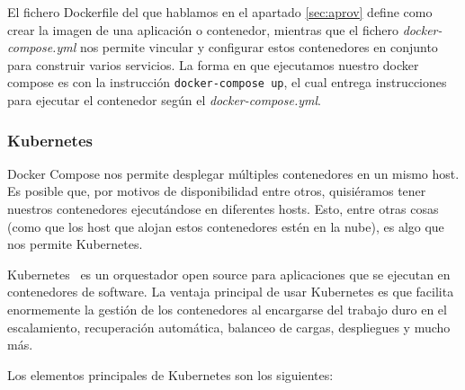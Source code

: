 	El fichero Dockerfile del que hablamos en el apartado \ref{sec:aprov} define como crear la imagen de una aplicación o contenedor, mientras que el fichero \textit{docker-compose.yml} nos permite vincular y configurar estos contenedores en conjunto para construir varios servicios. La forma en que ejecutamos nuestro docker compose es con la instrucción \texttt{docker-compose up}, el cual entrega instrucciones para ejecutar el contenedor según el \textit{docker-compose.yml}.

\subsubsection{Kubernetes}
	Docker Compose nos permite desplegar múltiples contenedores en un mismo host. Es posible que, por motivos de disponibilidad entre otros, quisiéramos tener nuestros contenedores ejecutándose en diferentes hosts. Esto, entre otras cosas (como que los host que alojan estos contenedores estén en la nube), es algo que nos permite Kubernetes.

	Kubernetes~\cite{orq3} es un orquestador open source para aplicaciones que se ejecutan en contenedores de software. La ventaja principal de usar Kubernetes es que facilita enormemente la gestión de los contenedores al encargarse del trabajo duro en el escalamiento, recuperación automática, balanceo de cargas, despliegues y mucho más. 



	Los elementos principales de Kubernetes son los siguientes:

